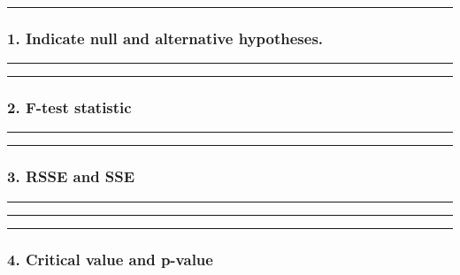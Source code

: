 \documentclass[
  letterpaper,
  DIV=11,
  numbers=noendperiod]{scrartcl}
\begin{document}
\begin{center}\rule{0.5\linewidth}{0.5pt}\end{center}

\subsubsection{\texorpdfstring{1. Indicate \textbf{null and alternative
hypotheses}.}{1. Indicate null and alternative hypotheses.}}\label{indicate-null-and-alternative-hypotheses.-1}

\begin{center}\rule{0.5\linewidth}{0.5pt}\end{center}

\begin{center}\rule{0.5\linewidth}{0.5pt}\end{center}

\subsubsection{\texorpdfstring{2. \textbf{F-test
statistic}}{2. F-test statistic}}\label{f-test-statistic-1}

\begin{center}\rule{0.5\linewidth}{0.5pt}\end{center}

\begin{center}\rule{0.5\linewidth}{0.5pt}\end{center}

\subsubsection{3. RSSE and SSE}\label{rsse-and-sse-1}

\begin{center}\rule{0.5\linewidth}{0.5pt}\end{center}

\begin{center}\rule{0.5\linewidth}{0.5pt}\end{center}

\begin{center}\rule{0.5\linewidth}{0.5pt}\end{center}

\subsubsection{4. Critical value and
p-value}\label{critical-value-and-p-value-1}
\end{document}
